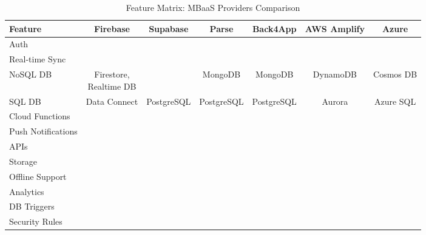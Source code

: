 \newcommand{\cmark}{\ding{51}}%
\newcommand{\xmark}{\ding{55}}%
\begin{table}[htbp]
	\footnotesize
	\setlength{\tabcolsep}{3pt} 
	\renewcommand{\arraystretch}{1.3}
	\caption{Feature Matrix: MBaaS Providers Comparison}
	\label{tab:mbaasfeatures}
	\begin{tabular}{|l|c|c|c|c|c|c|}
		\hline
		\rowcolor[gray]{0.9}
		\textbf{Feature} & \textbf{Firebase} & \textbf{Supabase} & \textbf{Parse} & \textbf{Back4App} & \textbf{AWS Amplify} & \textbf{Azure} \\
		\hline
		
		Auth & \cmark & \cmark & \cmark & \cmark & \cmark & \cmark \\
		\hline
		
		Real-time Sync & \cmark & \cmark & \cmark & \cmark & \cmark & \cmark \\
		\hline
		
		NoSQL DB & \makecell{Firestore,\\Realtime DB}  & \xmark & MongoDB & MongoDB & DynamoDB & Cosmos DB \\
		\hline
		
		SQL DB & Data Connect & PostgreSQL & PostgreSQL & PostgreSQL & Aurora & Azure SQL \\
		\hline
		
		Cloud Functions & \cmark & \cmark & \cmark & \cmark & \cmark & \cmark \\
		\hline
		
		Push Notifications & \cmark & \xmark & \cmark & \cmark & \cmark & \cmark \\
		\hline
		
		APIs & \cmark & \cmark & \cmark & \cmark & \cmark & \cmark \\
		\hline
		
		Storage & \cmark & \cmark & \cmark & \cmark & \cmark & \cmark \\
		\hline
		
		Offline Support & \cmark & \cmark & \cmark & \cmark & \cmark & \cmark \\
		\hline
		
		Analytics & \cmark & \xmark & \xmark & \cmark & \cmark & \xmark \\
		\hline
		
		DB Triggers & \cmark & \cmark & \cmark & \cmark & \cmark & \cmark \\
		\hline
		
		Security Rules & \cmark & \cmark & \cmark & \cmark & \cmark & \cmark \\
		\hline
		

\end{tabular}
\end{table}
